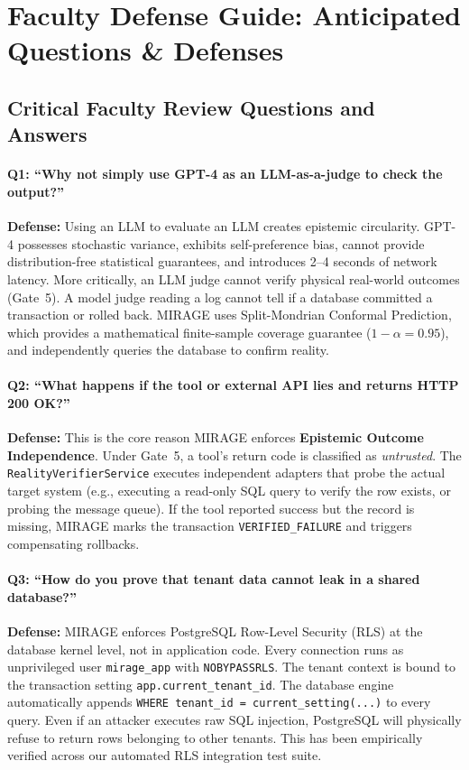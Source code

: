 \documentclass[11pt,a4paper]{article}
\begin{document}
\section{Faculty Defense Guide: Anticipated Questions \& Defenses}

\subsection{Critical Faculty Review Questions and Answers}

\paragraph{Q1: ``Why not simply use GPT-4 as an LLM-as-a-judge to check the output?''}
\textbf{Defense:} Using an LLM to evaluate an LLM creates epistemic circularity. GPT-4 possesses stochastic variance, exhibits self-preference bias, cannot provide distribution-free statistical guarantees, and introduces 2--4 seconds of network latency. More critically, an LLM judge cannot verify physical real-world outcomes (Gate~5). A model judge reading a log cannot tell if a database committed a transaction or rolled back. MIRAGE uses Split-Mondrian Conformal Prediction, which provides a mathematical finite-sample coverage guarantee ($1-\alpha=0.95$), and independently queries the database to confirm reality.

\paragraph{Q2: ``What happens if the tool or external API lies and returns HTTP 200 OK?''}
\textbf{Defense:} This is the core reason MIRAGE enforces \textbf{Epistemic Outcome Independence}. Under Gate~5, a tool's return code is classified as \emph{untrusted}. The \texttt{RealityVerifierService} executes independent adapters that probe the actual target system (e.g., executing a read-only SQL query to verify the row exists, or probing the message queue). If the tool reported success but the record is missing, MIRAGE marks the transaction \texttt{VERIFIED\_FAILURE} and triggers compensating rollbacks.

\paragraph{Q3: ``How do you prove that tenant data cannot leak in a shared database?''}
\textbf{Defense:} MIRAGE enforces PostgreSQL Row-Level Security (RLS) at the database kernel level, not in application code. Every connection runs as unprivileged user \texttt{mirage\_app} with \texttt{NOBYPASSRLS}. The tenant context is bound to the transaction setting \texttt{app.current\_tenant\_id}. The database engine automatically appends \texttt{WHERE tenant\_id = current\_setting(...)} to every query. Even if an attacker executes raw SQL injection, PostgreSQL will physically refuse to return rows belonging to other tenants. This has been empirically verified across our automated RLS integration test suite.
\end{document}
